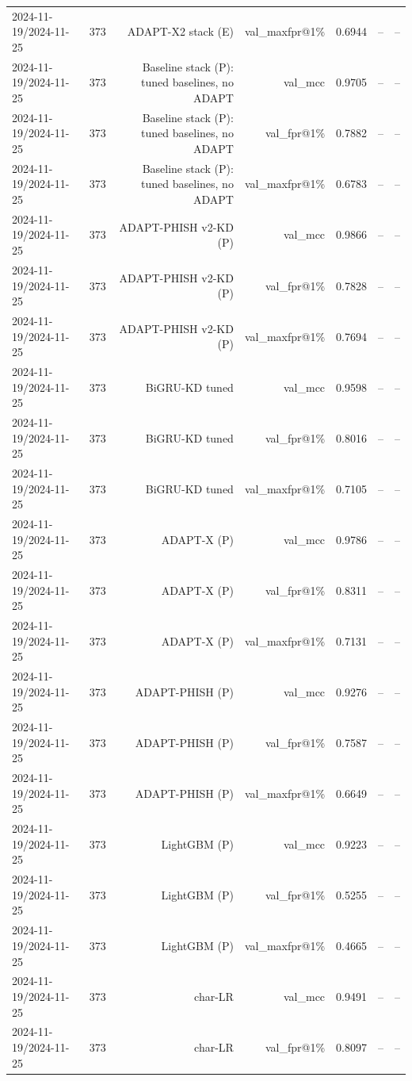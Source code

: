 \begin{table}[t]
\begin{tabular}{llrrrrr}
2024-11-19/2024-11-25 & 373 & ADAPT-X2 stack (E) & val\_maxfpr@1\% & 0.6944 & -- & -- \\
2024-11-19/2024-11-25 & 373 & Baseline stack (P): tuned baselines, no ADAPT & val\_mcc & 0.9705 & -- & -- \\
2024-11-19/2024-11-25 & 373 & Baseline stack (P): tuned baselines, no ADAPT & val\_fpr@1\% & 0.7882 & -- & -- \\
2024-11-19/2024-11-25 & 373 & Baseline stack (P): tuned baselines, no ADAPT & val\_maxfpr@1\% & 0.6783 & -- & -- \\
2024-11-19/2024-11-25 & 373 & ADAPT-PHISH v2-KD (P) & val\_mcc & 0.9866 & -- & -- \\
2024-11-19/2024-11-25 & 373 & ADAPT-PHISH v2-KD (P) & val\_fpr@1\% & 0.7828 & -- & -- \\
2024-11-19/2024-11-25 & 373 & ADAPT-PHISH v2-KD (P) & val\_maxfpr@1\% & 0.7694 & -- & -- \\
2024-11-19/2024-11-25 & 373 & BiGRU-KD tuned & val\_mcc & 0.9598 & -- & -- \\
2024-11-19/2024-11-25 & 373 & BiGRU-KD tuned & val\_fpr@1\% & 0.8016 & -- & -- \\
2024-11-19/2024-11-25 & 373 & BiGRU-KD tuned & val\_maxfpr@1\% & 0.7105 & -- & -- \\
2024-11-19/2024-11-25 & 373 & ADAPT-X (P) & val\_mcc & 0.9786 & -- & -- \\
2024-11-19/2024-11-25 & 373 & ADAPT-X (P) & val\_fpr@1\% & 0.8311 & -- & -- \\
2024-11-19/2024-11-25 & 373 & ADAPT-X (P) & val\_maxfpr@1\% & 0.7131 & -- & -- \\
2024-11-19/2024-11-25 & 373 & ADAPT-PHISH (P) & val\_mcc & 0.9276 & -- & -- \\
2024-11-19/2024-11-25 & 373 & ADAPT-PHISH (P) & val\_fpr@1\% & 0.7587 & -- & -- \\
2024-11-19/2024-11-25 & 373 & ADAPT-PHISH (P) & val\_maxfpr@1\% & 0.6649 & -- & -- \\
2024-11-19/2024-11-25 & 373 & LightGBM (P) & val\_mcc & 0.9223 & -- & -- \\
2024-11-19/2024-11-25 & 373 & LightGBM (P) & val\_fpr@1\% & 0.5255 & -- & -- \\
2024-11-19/2024-11-25 & 373 & LightGBM (P) & val\_maxfpr@1\% & 0.4665 & -- & -- \\
2024-11-19/2024-11-25 & 373 & char-LR & val\_mcc & 0.9491 & -- & -- \\
2024-11-19/2024-11-25 & 373 & char-LR & val\_fpr@1\% & 0.8097 & -- & -- \\

\end{tabular}
\end{table}

